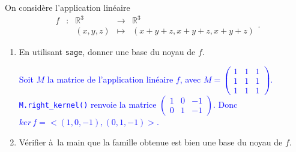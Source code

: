 \documentclass[a4paper,12pt]{article}
\def\R{\mathbb{R}}
\newcommand{\add}[1]{\textcolor{blue}{#1}}
\begin{document}
\begin{exercice}
    On considère l'application linéaire
    $$ \begin{array}{ccccc}
        f & : & \R^3 & \to & \R^3 \\
          &   & (x,y,z) & \mapsto & (x+y+z,x+y+z,x+y+z)
      \end{array}.$$
     \begin{enumerate}
         \item En utilisant {\tt sage}, donner une base du noyau de $f$.

            \add{
                Soit $M$ la matrice de l'application linéaire $f$, avec $M=\left(\begin{array}{ccc} 1 & 1 & 1\\1 & 1 & 1\\1 & 1 & 1\end{array}\right)$.
                \newline
                {\tt M.right\_kernel()} renvoie la matrice $\left(\begin{array}{ccc}1 & 0 & -1 \\ 0 & 1 & -1\end{array}\right)$. Donc $ker\,f=<(1,0,-1),(0,1,-1)>$.
            }
         \item Vérifier à la main que la famille obtenue est bien une base du noyau de $f$.


\end{enumerate}
\end{exercice}
\end{document}
